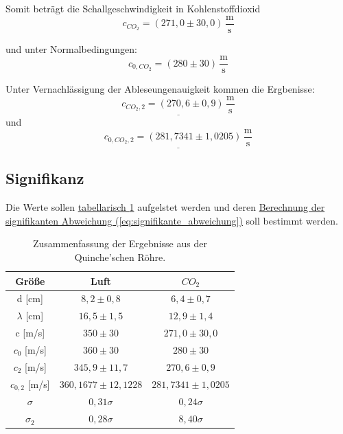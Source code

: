 Somit beträgt die Schallgeschwindigkeit in Kohlenstoffdioxid
\begin{equation}
\boxed{
    c_{CO_2} = (271,0 \pm 30,0) \, \mathrm{\frac{m}{s}}
}
\end{equation}

und unter Normalbedingungen:
\begin{equation}
\boxed{
    c_{0,CO_2} = (280 \pm 30) \, \mathrm{\frac{m}{s}}
}
\end{equation}

Unter Vernachlässigung der Ableseungenauigkeit kommen die Ergbenisse: 
\begin{equation}
\underline{
    c_{CO_2,2} = (270,6\pm 0,9)  \, \mathrm{\frac{m}{s}}
    }
\end{equation}
und
\begin{equation}
\underline{
    c_{0,CO_2,2} = (281,7341\pm 1,0205) \, \mathrm{\frac{m}{s}}
    }
\end{equation}

\subsection{Signifikanz}
Die Werte sollen \hyperref[tab:ergbnisse_1]{tabellarisch \ref*{tab:ergbnisse_1}} aufgelstet werden und deren \hyperref[eq:signifikante_abweichung]{Berechnung der signifikanten Abweichung (\ref*{eq:signifikante_abweichung})} soll bestimmt werden.
\begin{table}[!ht]
    \centering
    \begin{tabular}{c | c | c}
        \toprule
        Größe & Luft & $CO_2$ \\
        \hline
        d [cm] & $8,2 \pm 0,8$ & $6,4 \pm 0,7$ \\
        $\lambda$ [cm] & $16,5 \pm 1,5$ & $12,9 \pm 1,4$ \\ 
        \midrule
        c [m/s] & $350 \pm 30$ & $271,0 \pm 30,0$ \\
        $c_0$ [m/s] & $360 \pm 30$ & $280 \pm 30$ \\
        \midrule
        $c_2$ [m/s] & $345,9 \pm 11,7$ & $270,6 \pm 0,9$ \\
        $c_{0,2}$ [m/s] & $360,1677 \pm 12,1228$ & $281,7341 \pm 1,0205$ \\
        \midrule
        \midrule
        $\sigma$ & $0,31\sigma$ & $0,24\sigma$ \\
        $\sigma_2$ & $0,28\sigma$ & $8,40\sigma$ \\
        \bottomrule
    \end{tabular}
    \label{tab:ergbnisse_1}
    \caption{Zusammenfassung der Ergebnisse aus der Quinche'schen Röhre.}
\end{table}

